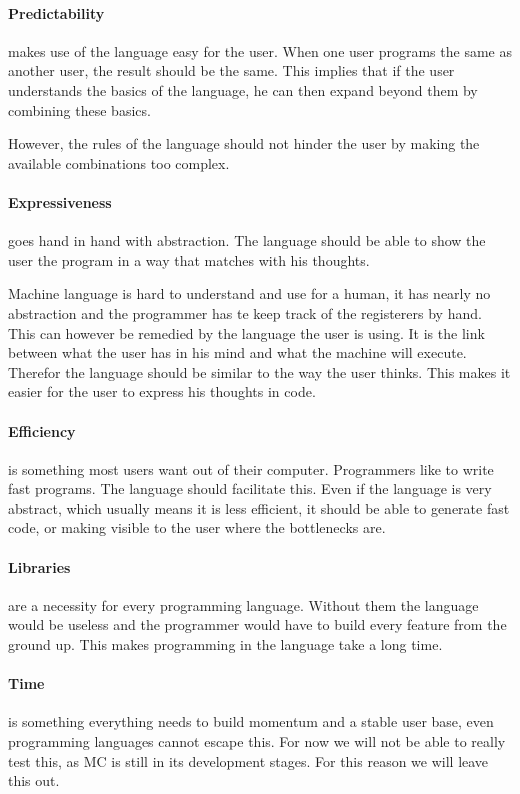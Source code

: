 \begin{multicols}{2}
   \paragraph{Predictability}
   makes use of the language easy for the user.
   When one user programs the same as another user, the result should be the same.
   This implies that if the user understands the basics of the language, he can then expand beyond them by combining these basics.

   However, the rules of the language should not hinder the user by making the available combinations too complex.

   \paragraph{Expressiveness}
   goes hand in hand with abstraction.
   The language should be able to show the user the program in a way that matches with his thoughts.

   Machine language is hard to understand and use for a human, it has nearly no abstraction and the programmer has te keep track of the registerers by hand.
   This can however be remedied by the language the user is using.
   It is the link between what the user has in his mind and what the machine will execute.
   Therefor the language should be similar to the way the user thinks.
   This makes it easier for the user to express his thoughts in code.

   \paragraph{Efficiency}
   is something most users want out of their computer.
   Programmers like to write fast programs.
   The language should facilitate this.
   Even if the language is very abstract, which usually means it is less efficient\cite{graham2004hackers}, it should be able to generate fast code, or making visible to the user where the bottlenecks are.

   \paragraph{Libraries}
   are a necessity for every programming language.
   Without them the language would be useless and the programmer would have to build every feature from the ground up.
   This makes programming in the language take a long time.

   \paragraph{Time}
   is something everything needs to build momentum and a stable user base, even programming languages cannot escape this.
   For now we will not be able to really test this, as MC is still in its development stages.
   For this reason we will leave this out.


\end{multicols}
